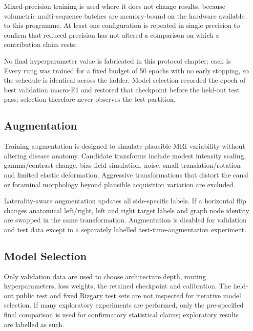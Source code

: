 Mixed-precision training \cite{micikevicius2018mixed} is used where it does not
change results, because volumetric multi-sequence batches are memory-bound on
the hardware available to this programme. At least one configuration is repeated
in single precision to confirm that reduced precision has not altered a
comparison on which a contribution claim rests.

No final hyperparameter value is fabricated in this protocol chapter; each is
Every rung was trained for a fixed budget of 50 epochs with no early stopping,
so the schedule is identical across the ladder. Model selection recorded the
epoch of best validation macro-F1 and restored that checkpoint before the
held-out test pass; selection therefore never observes the test partition.

\subsection{Augmentation}
\label{sec:method-augmentation}

Training augmentation is designed to simulate plausible MRI variability without
altering disease anatomy. Candidate transforms include modest intensity scaling,
gamma/contrast change, bias-field simulation, noise, small translation/rotation
and limited elastic deformation. Aggressive transformations that distort the
canal or foraminal morphology beyond plausible acquisition variation are
excluded.

Laterality-aware augmentation updates all side-specific labels. If a horizontal
flip changes anatomical left/right, left and right target labels and graph node
identity are swapped in the same transformation. Augmentation is disabled for
validation and test data except in a separately labelled test-time-augmentation
experiment.

\subsection{Model Selection}
\label{sec:method-model-selection}

Only validation data are used to choose architecture depth, routing
hyperparameters, loss weights, the retained checkpoint and calibration. The held-out
public test and fixed Rizgary test sets are not inspected for iterative model
selection. If many exploratory experiments are performed, only the pre-specified
final comparison is used for confirmatory statistical claims; exploratory
results are labelled as such.


